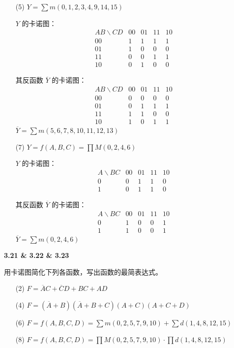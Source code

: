 \documentclass[10pt, a4paper]{article}
\newcommand{\question}[2]{
    \vspace{2ex}\noindent\textbf{#1}\ {\kaishu #2} \par\vspace{1ex}
}
\begin{document}
{\begin{enumerate}
\item[(5)] $Y = \sum m(0,1,2,3,4,9,14,15)$

$Y$ 的卡诺图：
\[
\begin{array}{c|cccc}
AB\backslash CD & 00 & 01 & 11 & 10 \\ \hline
00 & 1 & 1 & 1 & 1 \\
01 & 1 & 0 & 0 & 0 \\
11 & 0 & 0 & 1 & 1 \\
10 & 0 & 1 & 0 & 0 
\end{array}
\]

其反函数 $\overline{Y}$ 的卡诺图：
\[
\begin{array}{c|cccc}
AB\backslash CD & 00 & 01 & 11 & 10 \\ \hline
00 & 0 & 0 & 0 & 0 \\
01 & 0 & 1 & 1 & 1 \\
11 & 1 & 1 & 0 & 0 \\
10 & 1 & 0 & 1 & 1 
\end{array}
\]
$\overline{Y} = \sum m(5,6,7,8,10,11,12,13)$

\item[(7)] $Y = f(A,B,C) = \prod M(0,2,4,6)$

$Y$ 的卡诺图：
\[
\begin{array}{c|cccc}
A\backslash BC & 00 & 01 & 11 & 10 \\ \hline
0 & 0 & 1 & 1 & 0 \\
1 & 0 & 1 & 1 & 0 
\end{array}
\]

其反函数 $\overline{Y}$ 的卡诺图：
\[
\begin{array}{c|cccc}
A\backslash BC & 00 & 01 & 11 & 10 \\ \hline
0 & 1 & 0 & 0 & 1 \\
1 & 1 & 0 & 0 & 1 
\end{array}
\]
$\overline{Y} = \sum m(0,2,4,6)$
\end{enumerate}
}

\question{3.21 \& 3.22 \& 3.23}{
用卡诺图简化下列各函数，写出函数的最简{\heiti{与-或、或-与、与-或非}}表达式。
\begin{enumerate}
    \item[(2)] $F = \overline{A}C + \overline{C}D + BC + AD$
    \item[(4)] $F = (\overline{A}+B)(\overline{A}+B+C)(A+C)(A+C+D)$
    \item[(6)] $F = f(A, B, C, D) = \sum m(0, 2, 5, 7, 9, 10) + \sum d(1, 4, 8, 12, 15)$
    \item[(8)] $F = f(A, B, C, D) = \prod M(0, 2, 5, 7, 9, 10) \cdot \prod d(1, 4, 8, 12, 15)$
\end{enumerate}
}
\end{document}

